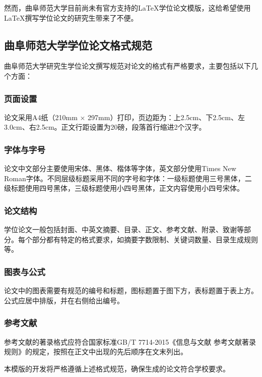 然而，曲阜师范大学目前尚未有官方支持的\LaTeX{}学位论文模版，这给希望使用\LaTeX{}撰写学位论文的研究生带来了不便。

\subsection{曲阜师范大学学位论文格式规范}
曲阜师范大学研究生学位论文撰写规范对论文的格式有严格要求，主要包括以下几个方面：

\subsubsection{页面设置}
论文采用A4纸（210mm $\times$ 297mm）打印，页边距为：上2.5cm、下2.5cm、左3.0cm、右2.5cm。正文行距设置为20磅，段落首行缩进2个汉字。

\subsubsection{字体与字号}
论文中文部分主要使用宋体、黑体、楷体等字体，英文部分使用Times New Roman字体。不同层级标题采用不同的字号和字体：一级标题使用三号黑体，二级标题使用四号黑体，三级标题使用小四号黑体，正文内容使用小四号宋体。

\subsubsection{论文结构}
学位论文一般包括封面、中英文摘要、目录、正文、参考文献、附录、致谢等部分。每个部分都有特定的格式要求，如摘要字数限制、关键词数量、目录生成规则等。

\subsubsection{图表与公式}
论文中的图表需要有规范的编号和标题，图标题置于图下方，表标题置于表上方。公式应居中排版，并在右侧给出编号。

\subsubsection{参考文献}
参考文献的著录格式应符合国家标准GB/T 7714-2015《信息与文献 参考文献著录规则》的规定，按照在正文中出现的先后顺序在文末列出。

本模版的开发将严格遵循上述格式规范，确保生成的论文符合学校要求。
